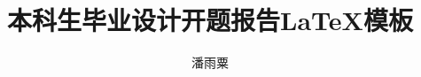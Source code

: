   \title[本科生毕业设计开题报告\LaTeX{}模板]{本科生毕业设计开题报告\LaTeX{}模板}%
  \author{潘雨粟}%
\maketitle
\tableofcontents
